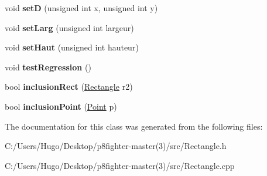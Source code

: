 \begin{DoxyCompactItemize}
void {\bfseries setD} (unsigned int x, unsigned int y)
\item 
\mbox{\label{class_rectangle_a5bcceb7511e5ce94128821b0ba7dd4af}} 
void {\bfseries set\+Larg} (unsigned int largeur)
\item 
\mbox{\label{class_rectangle_a4c9bea6cf4e6bd006dbc8ae909c71e3f}} 
void {\bfseries set\+Haut} (unsigned int hauteur)
\item 
\mbox{\label{class_rectangle_a9afbcec05d75fab9c65220356f72f268}} 
void {\bfseries test\+Regression} ()
\item 
\mbox{\label{class_rectangle_ad2c10a2415ea4f904d102c84ee584d8e}} 
bool {\bfseries inclusion\+Rect} (\hyperlink{class_rectangle}{Rectangle} r2)
\item 
\mbox{\label{class_rectangle_ae85d3c2b55505c6555bc3431fd40e4cb}} 
bool {\bfseries inclusion\+Point} (\hyperlink{class_point}{Point} p)
\end{DoxyCompactItemize}


The documentation for this class was generated from the following files\+:\begin{DoxyCompactItemize}
\item 
C\+:/\+Users/\+Hugo/\+Desktop/p8fighter-\/master(3)/src/Rectangle.\+h\item 
C\+:/\+Users/\+Hugo/\+Desktop/p8fighter-\/master(3)/src/Rectangle.\+cpp\end{DoxyCompactItemize}
